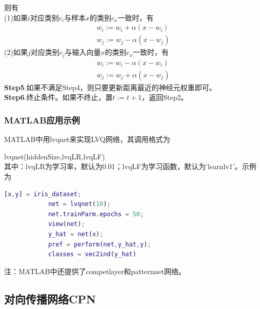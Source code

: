 {            则有\\
            (1)如果$i$对应类别$c_i$与样本$x$的类别$c_x$一致时，有
            \begin{align*}
            w_i :=w_i + \alpha(x-w_i)\\
            w_j :=w_j - \alpha(x-w_j)
            \end{align*}
            (2)如果$j$对应类别$c_j$与输入向量$x$的类别$c_x$一致时，有
            \begin{align*}
            w_i :=w_i - \alpha(x-w_i)\\
            w_j :=w_j + \alpha(x-w_j)
            \end{align*}
            \textbf{Step5}.如果不满足Step4，则只要更新距离最近的神经元权重即可。\\
            \textbf{Step6}.终止条件。如果不终止，置$t:=t+1$，返回Step2。

        \subsubsection{MATLAB应用示例}
            \par
            MATLAB中用lvqnet来实现LVQ网络，其调用格式为
            \par
            lvqnet(hiddenSize,lvqLR,lvqLF)\\
            其中：lvqLR为学习率，默认为0.01；lvqLF为学习函数，默认为'learnlv1'。示例为
            \begin{lstlisting}[language = Matlab]
            [x,y] = iris_dataset;
            net = lvqnet(10);
            net.trainParm.epochs = 50;
            view(net);
            y_hat = net(x);
            pref = perform(net,y_hat,y);
            classes = vec2ind(y_hat)
            \end{lstlisting}
            注：MATLAB中还提供了competlayer和patternnet网络。

    \subsection{对向传播网络CPN}
}
